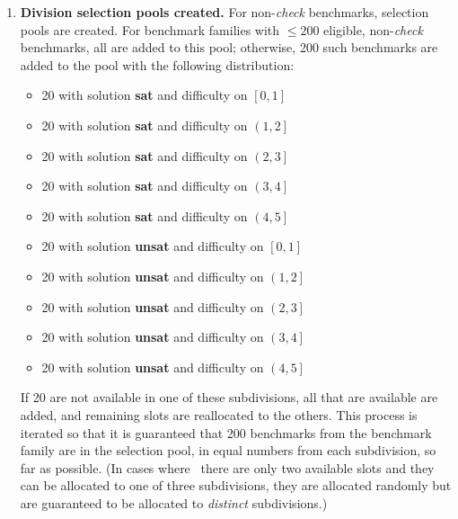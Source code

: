 \documentclass[12pt]{article}
\begin{document}
\begin{enumerate}
\item\label{step:pool} \textbf{Division selection pools created.} %
  For non-\emph{check} benchmarks, selection pools are created.
  For benchmark families with $\leq200$ eligible,
  non-\emph{check} benchmarks, all are added to this pool;
  otherwise, 200 such benchmarks are added to the pool with the
  following distribution:
%
  \begin{itemize}
  \item 20 with solution \textbf{sat} and difficulty on $\left[0,1\right]$
  \item 20 with solution \textbf{sat} and difficulty on $\left(1,2\right]$
  \item 20 with solution \textbf{sat} and difficulty on $\left(2,3\right]$
  \item 20 with solution \textbf{sat} and difficulty on $\left(3,4\right]$
  \item 20 with solution \textbf{sat} and difficulty on $\left(4,5\right]$
  \item 20 with solution \textbf{unsat} and difficulty on $\left[0,1\right]$
  \item 20 with solution \textbf{unsat} and difficulty on $\left(1,2\right]$
  \item 20 with solution \textbf{unsat} and difficulty on $\left(2,3\right]$
  \item 20 with solution \textbf{unsat} and difficulty on $\left(3,4\right]$
  \item 20 with solution \textbf{unsat} and difficulty on $\left(4,5\right]$
  \end{itemize}
%
  If 20 are not available in one of these subdivisions, all that are
  available are added, and remaining slots are reallocated to the
  others.  This process is iterated so that it is guaranteed that 200
  benchmarks from the benchmark family are in the selection pool, in
  equal numbers from each subdivision, so far as possible.
  (In cases where \eg\ there are only two available slots and
  they can be allocated to one of three subdivisions, they are allocated
  randomly but are guaranteed to be allocated to \emph{distinct}
  subdivisions.)


\end{enumerate}
\end{document}
